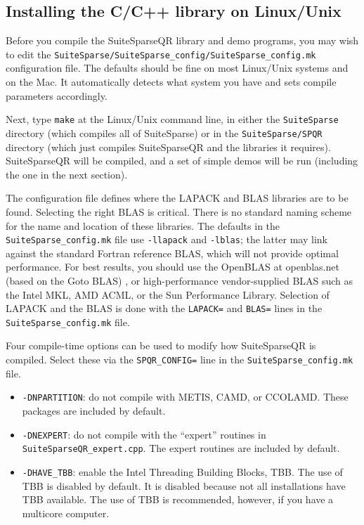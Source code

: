 \documentclass[12pt]{article}
\begin{document}
\subsection{Installing the C/C++ library on Linux/Unix}

Before you compile the SuiteSparseQR library and demo programs, you may wish to
edit the \verb'SuiteSparse/SuiteSparse_config/SuiteSparse_config.mk' configuration file.  The
defaults should be fine on most Linux/Unix systems and on the Mac.
It automatically detects what system you have and sets compile parameters
accordingly.

Next, type \verb'make' at
the Linux/Unix command line, in either the \verb'SuiteSparse' directory (which
compiles all of SuiteSparse) or in the \verb'SuiteSparse/SPQR' directory (which
just compiles SuiteSparseQR and the libraries it requires).  SuiteSparseQR will
be compiled, and a set of simple demos will be run (including the one in the
next section).

The configuration file defines where the LAPACK and BLAS libraries are to be
found.  Selecting the right BLAS is critical.  There is no standard naming
scheme for the name and location of these libraries.  The defaults in the
\verb'SuiteSparse_config.mk' file use \verb'-llapack' and \verb'-lblas'; the latter may
link against the standard Fortran reference BLAS, which will not provide
optimal performance.  For best results, you should use the OpenBLAS
at openblas.net
(based on the Goto BLAS)
\cite{GotoVanDeGeijn08}, or high-performance vendor-supplied BLAS such as the
Intel MKL, AMD ACML, or the Sun Performance Library.  Selection of LAPACK and
the BLAS is done with the \verb'LAPACK=' and \verb'BLAS=' lines in the
\verb'SuiteSparse_config.mk' file.

Four compile-time options can be used to modify how SuiteSparseQR is compiled.
Select these via the \verb'SPQR_CONFIG=' line in the \verb'SuiteSparse_config.mk' file.

\begin{itemize}

    \item \verb'-DNPARTITION': do not compile with METIS, CAMD, or CCOLAMD.
    These packages are included by default.

    \item \verb'-DNEXPERT': do not compile with the ``expert'' routines in
    \verb'SuiteSparseQR_expert.cpp'.  The expert routines are included by
    default.

    \item \verb'-DHAVE_TBB': enable the Intel Threading Building Blocks, TBB.
    The use of TBB is disabled by default.  It is disabled because not all
    installations have TBB available.  The use of TBB is recommended, however,
    if you have a multicore computer.

\end{itemize}
\end{document}
